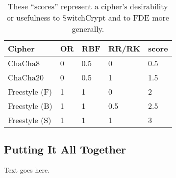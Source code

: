 \begin{table}[]
  \begin{tabular}{@{}lllll@{}}
  \toprule
  \textbf{Cipher} & \textbf{OR} & \textbf{RBF} & \textbf{RR/RK} & \textbf{score} \\ \midrule
  ChaCha8         & 0           & 0.5          & 0              & 0.5            \\
  ChaCha20        & 0           & 0.5          & 1              & 1.5            \\
  Freestyle (F)   & 1           & 1            & 0              & 2              \\
  Freestyle (B)   & 1           & 1            & 0.5            & 2.5            \\
  Freestyle (S)   & 1           & 1            & 1              & 3
  \end{tabular}
  \caption{These ``scores'' represent a cipher's desirability or usefulness to
  SwitchCrypt and to FDE more generally. }
  \label{tbl:security-quant}
\end{table}

\subsection{Putting It All Together} \label{subsec:summary}

Text goes here.

